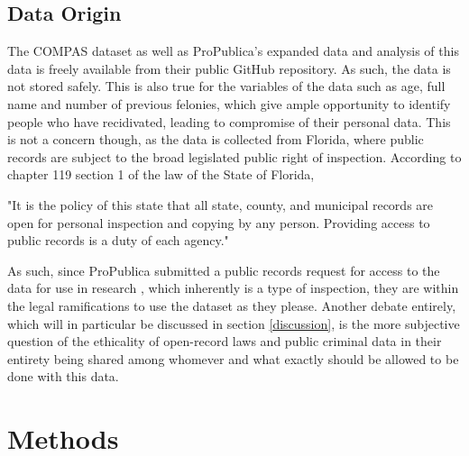 \documentclass[11pt, fleqn, titlepage]{article}
\begin{document}
	
	
	\subsection{Data Origin}
	The COMPAS dataset as well as ProPublica's expanded data and analysis of this data is freely available from their public GitHub repository. As such, the data is not stored safely. This is also true for the variables of the data such as age, full name and number of previous felonies, which give ample opportunity to identify people who have recidivated, leading to compromise of their personal data. This is not a concern though, as the data is collected from Florida, where public records are subject to the broad legislated public right of inspection. According to chapter 119 section 1 of the law of the State of Florida, 
	\begin{displayquote}
		"It is the policy of this state that all state, county, and municipal records are open for personal inspection and copying by any person. Providing access to public records is a duty of each agency." \cite{floridaLaw}
	\end{displayquote}
	
	\noindent As such, since ProPublica submitted a public records request for access to the data for use in research \cite{propublicaAnalysis}, which inherently is a type of inspection, they are within the legal ramifications to use the dataset as they please. Another debate entirely, which will in particular be discussed in section \ref{discussion}, is the more subjective question of the ethicality of open-record laws and public criminal data in their entirety being shared among whomever and what exactly should be allowed to be done with this data.
	
		
	\section{Methods} \label{methods}
	
\end{document}
